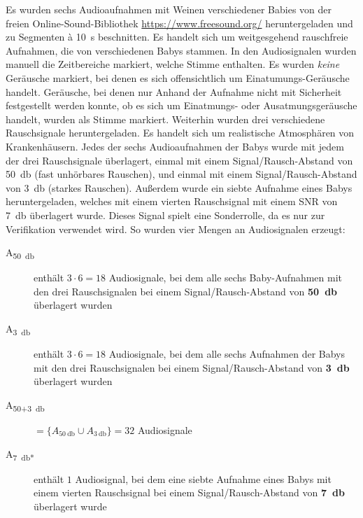 Es wurden sechs Audioaufnahmen mit Weinen verschiedener Babies von der freien Online-Sound-Bibliothek \url{https://www.freesound.org/} heruntergeladen und zu Segmenten \`{a} \SI{10}{\second} beschnitten. Es handelt sich um weitgesgehend rauschfreie Aufnahmen, die von verschiedenen Babys stammen. In den Audiosignalen wurden manuell die Zeitbereiche markiert, welche Stimme enthalten. Es wurden \emph{keine} Geräusche markiert, bei denen es sich offensichtlich um Einatumungs-Geräusche handelt. Geräusche, bei denen nur Anhand der Aufnahme nicht mit Sicherheit festgestellt werden konnte, ob es sich um Einatmungs- oder Ausatmungsgeräusche handelt, wurden als Stimme markiert. Weiterhin wurden drei verschiedene Rauschsignale heruntergeladen. Es handelt sich um \glqq realistische\grqq{} Atmosphären von Krankenhäusern. Jedes der sechs Audioaufnahmen der Babys wurde mit jedem der drei Rauschsignale überlagert, einmal mit einem Signal/Rausch-Abstand von \SI{50}{\decibel} (\glqq fast unhörbares Rauschen\grqq), und einmal mit einem Signal/Rausch-Abstand von \SI{3}{\decibel} (\glqq starkes Rauschen\grqq). Außerdem wurde ein siebte Aufnahme eines Babys heruntergeladen, welches mit einem vierten Rauschsignal mit einem SNR von \SI{7}{\decibel} überlagert wurde. Dieses Signal spielt eine Sonderrolle, da es nur zur Verifikation verwendet wird. So wurden vier Mengen an Audiosignalen erzeugt:

\begin{description}
	\item[A\textsubscript{\SI{50}{\decibel}}] enthält $3 \cdot 6 = 18$ Audiosignale, bei dem alle sechs Baby-Aufnahmen mit den drei Rauschsignalen bei einem Signal/Rausch-Abstand von \textbf{\SI{50}{\decibel}} überlagert wurden
	
	\item[A\textsubscript{\SI{3}{\decibel}}] enthält $3 \cdot 6 = 18$ Audiosignale, bei dem alle sechs Aufnahmen der Babys mit den drei Rauschsignalen bei einem Signal/Rausch-Abstand von \textbf{\SI{3}{\decibel}} überlagert wurden
	
	\item[A\textsubscript{50+\SI{3}{\decibel}}] $ = \{ A_{\SI{50}{\decibel}} \cup  A_{\SI{3}{\decibel}}\} = 32$ Audiosignale
	
	\item[A\textsubscript{\SI{7}{\decibel}*}] enthält $1$ Audiosignal, bei dem eine siebte Aufnahme eines Babys mit einem vierten Rauschsignal bei einem Signal/Rausch-Abstand von \textbf{\SI{7}{\decibel}} überlagert wurde
	
\end{description}

